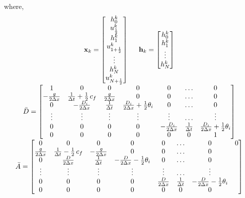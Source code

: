 where,
\begin{equation}
\label{statespace_swe}
\begin{array}{c}
\textbf{x}_k = \begin{bmatrix}
h_0^k \\ u^k_{\frac{1}{2}} \\ h_1^k \\ u^k_{1+\frac{1}{2}} \\ \vdots \\ h_N^k \\ u^k_{N+\frac{1}{2}} 
\end{bmatrix}  \hspace{5mm}
\textbf{h}_k = \begin{bmatrix}
h_0^k \\  h_1^k \\  \vdots \\ h_N^k \\ 
\end{bmatrix} \\
\bar{D} = \begin{bmatrix}
1 & 0 & 0 & 0 & 0 & \ldots & 0 \\
-\frac {g}{2\Delta x} & {\frac {1}{\Delta t}}+\frac{1}{2}\,c_{{f}} & \frac {g}{2\Delta x}  & 0 & 0 & {\ldots } & 0 \\
0 & -\frac {D_i}{2\Delta x}   & \frac {1}{\Delta t} & \frac {D_i}{2\Delta x} + \frac{1}{2}\theta_i & 0 & {\ldots } & 0 \\
\vdots & \vdots & \vdots & \vdots & \vdots & {\ldots } & \vdots \\
0 & 0 & 0 & 0 & -\frac {D_i}{2\Delta x} & \frac {1}{\Delta t} & \frac {D_i}{2\Delta x} + \frac{1}{2}\theta_i \\
0 & 0 & 0 & 0 & 0 & 0 & 1
\end{bmatrix} \\
\bar{A} = \begin{bmatrix}
0 & 0 & 0 & 0 & 0 & \ldots & 0 & 0 \\
\frac {g}{2\Delta x} & {\frac {1}{\Delta t}}-\frac{1}{2}\,c_{{f}} & -\frac {g}{2\Delta x} & 0 & 0 & {\ldots } & 0 \\
0 & \frac {D}{2\Delta x} & \frac {1}{\Delta t} & -\frac {D}{2\Delta x} - \frac{1}{2}\theta_i & 0 & {\ldots } & 0 \\
\vdots & \vdots & \vdots & \vdots & \vdots & {\ldots } & \vdots \\
0 & 0 & 0 & 0 & \frac {D}{2\Delta x} & \frac {1}{\Delta t} & -\frac {D}{2\Delta x} - \frac{1}{2}\theta_i \\
0 & 0 & 0 & 0 & 0 & 0 & 0

\end{bmatrix}
\end{array}
\end{equation}
